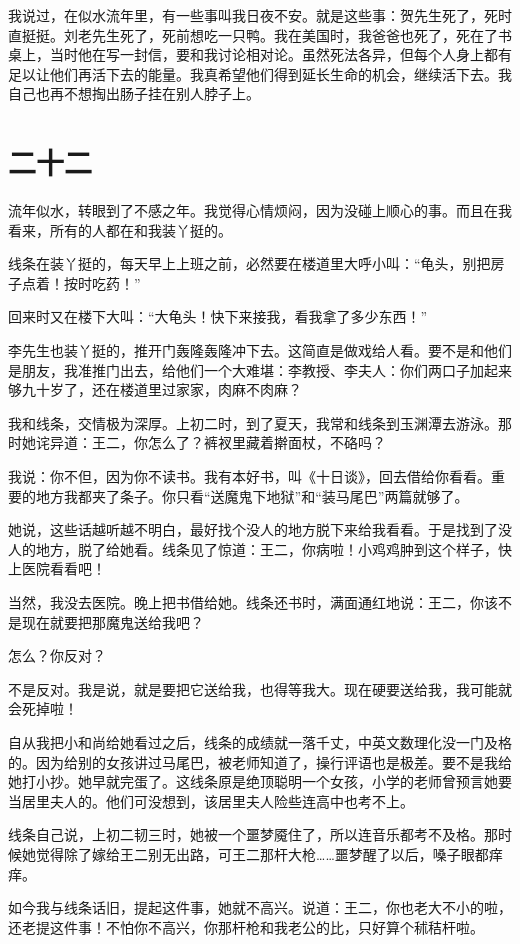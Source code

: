 我说过，在似水流年里，有一些事叫我日夜不安。就是这些事：贺先生死了，死时直挺挺。刘老先生死了，死前想吃一只鸭。我在美国时，我爸爸也死了，死在了书桌上，当时他在写一封信，要和我讨论相对论。虽然死法各异，但每个人身上都有足以让他们再活下去的能量。我真希望他们得到延长生命的机会，继续活下去。我自己也再不想掏出肠子挂在别人脖子上。

\section{二十二}

流年似水，转眼到了不感之年。我觉得心情烦闷，因为没碰上顺心的事。而且在我看来，所有的人都在和我装丫挺的。 

线条在装丫挺的，每天早上上班之前，必然要在楼道里大呼小叫：“龟头，别把房子点着！按时吃药！” 

回来时又在楼下大叫：“大龟头！快下来接我，看我拿了多少东西！” 

李先生也装丫挺的，推开门轰隆轰隆冲下去。这简直是做戏给人看。要不是和他们是朋友，我准推门出去，给他们一个大难堪：李教授、李夫人：你们两口子加起来够九十岁了，还在楼道里过家家，肉麻不肉麻？ 

我和线条，交情极为深厚。上初二时，到了夏天，我常和线条到玉渊潭去游泳。那时她诧异道：王二，你怎么了？裤衩里藏着擀面杖，不硌吗？ 

我说：你不但，因为你不读书。我有本好书，叫《十日谈》，回去借给你看看。重要的地方我都夹了条子。你只看“送魔鬼下地狱”和“装马尾巴”两篇就够了。 

她说，这些话越听越不明白，最好找个没人的地方脱下来给我看看。于是找到了没人的地方，脱了给她看。线条见了惊道：王二，你病啦！小鸡鸡肿到这个样子，快上医院看看吧！ 

当然，我没去医院。晚上把书借给她。线条还书时，满面通红地说：王二，你该不是现在就要把那魔鬼送给我吧？ 


怎么？你反对？ 

不是反对。我是说，就是要把它送给我，也得等我大。现在硬要送给我，我可能就会死掉啦！ 

自从我把小和尚给她看过之后，线条的成绩就一落千丈，中英文数理化没一门及格的。因为给别的女孩讲过马尾巴，被老师知道了，操行评语也是极差。要不是我给她打小抄。她早就完蛋了。这线条原是绝顶聪明一个女孩，小学的老师曾预言她要当居里夫人的。他们可没想到，该居里夫人险些连高中也考不上。 

线条自己说，上初二韧三时，她被一个噩梦魇住了，所以连音乐都考不及格。那时候她觉得除了嫁给王二别无出路，可王二那杆大枪……噩梦醒了以后，嗓子眼都痒痒。 

如今我与线条话旧，提起这件事，她就不高兴。说道：王二，你也老大不小的啦，还老提这件事！不怕你不高兴，你那杆枪和我老公的比，只好算个秫秸杆啦。 

